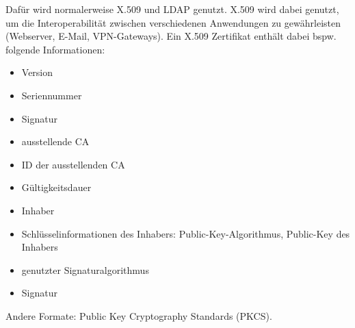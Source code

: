 Dafür wird normalerweise X.509 und LDAP genutzt.
X.509 wird dabei genutzt, um die Interoperabilität zwischen verschiedenen Anwendungen zu
gewährleisten (Webserver, E-Mail, VPN-Gateways).
Ein X.509 Zertifikat enthält dabei bspw. folgende Informationen:
\begin{itemize}
  \item Version
  \item Seriennummer
  \item Signatur
  \item ausstellende CA
  \item ID der ausstellenden CA
  \item Gültigkeitsdauer
  \item Inhaber
  \item Schlüsselinformationen des Inhabers: Public-Key-Algorithmus, Public-Key des
    Inhabers
  \item genutzter Signaturalgorithmus
  \item Signatur
\end{itemize}

Andere Formate: Public Key Cryptography Standards (PKCS).
